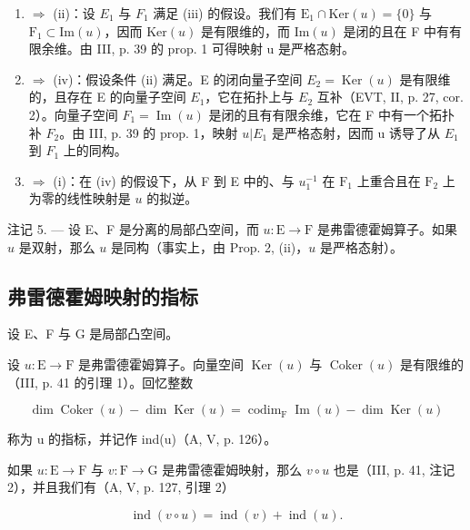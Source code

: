 \begin{enumerate}
\def\labelenumi{(\roman{enumi})}
\setcounter{enumi}{2}
\item
  \(\Longrightarrow\) (ii)：设 \(E_{1}\) 与 \(F_{1}\) 满足 (iii) 的假设。我们有 \(\mathrm{E}_{1}\cap\mathrm{Ker}(u)=\{0\}\) 与 \(\mathrm{F}_{1}\subset\mathrm{Im}(u)\)，因而 \(\mathrm{Ker}(u)\) 是有限维的，而 \(\mathrm{Im}(u)\) 是闭的且在 F 中有有限余维。由 III, p. 39 的 prop. 1 可得映射 u 是严格态射。
\item
   \(\Longrightarrow\) (iv)：假设条件 (ii) 满足。E 的闭向量子空间 \(E_{2} = \operatorname{Ker}(u)\) 是有限维的，且存在 E 的向量子空间 \(E_{1}\)，它在拓扑上与 \(E_{2}\) 互补（EVT, II, p. 27, cor. 2）。向量子空间 \(F_{1} = \operatorname{Im}(u)\) 是闭的且有有限余维，它在 F 中有一个拓扑补 \(F_{2}\)。由 III, p. 39 的 prop. 1，映射 \(u|E_{1}\) 是严格态射，因而 u 诱导了从 \(E_{1}\) 到 \(F_{1}\) 上的同构。
\item
   \(\Longrightarrow\) (i)：在 (iv) 的假设下，从 F 到 E 中的、与 \(u_1^{-1}\) 在 \(\mathrm{F}_1\) 上重合且在 \(\mathrm{F}_2\) 上为零的线性映射是 \(u\) 的拟逆。
\end{enumerate}

注记 5. --- 设 E、F 是分离的局部凸空间，而 \(u\colon\mathrm{E}\to\mathrm{F}\) 是弗雷德霍姆算子。如果 \(u\) 是双射，那么 \(u\) 是同构（事实上，由 Prop. 2, (ii)，\(u\) 是严格态射）。

\subsection{弗雷德霍姆映射的指标}

设 E、F 与 G 是局部凸空间。

设 \(u \colon \mathrm{E} \to \mathrm{F}\) 是弗雷德霍姆算子。向量空间 \(\operatorname{Ker}(u)\) 与 \(\operatorname{Coker}(u)\) 是有限维的（III, p. 41 的引理 1）。回忆整数

\[
\dim \operatorname{Coker} (u) - \dim \operatorname{Ker} (u) = \operatorname{codim} _ {\mathrm{F}} \operatorname{Im} (u) - \dim \operatorname{Ker} (u) \tag {1}
\]

称为 u 的指标，并记作 ind(u)（A, V, p. 126）。

如果 \(u \colon \mathrm{E} \to \mathrm{F}\) 与 \(v \colon \mathrm{F} \to \mathrm{G}\) 是弗雷德霍姆映射，那么 \(v \circ u\) 也是（III, p. 41, 注记 2），并且我们有（A, V, p. 127, 引理 2）

\[
\operatorname{ind} (v \circ u) = \operatorname{ind} (v) + \operatorname{ind} (u).\tag{2}
\]

